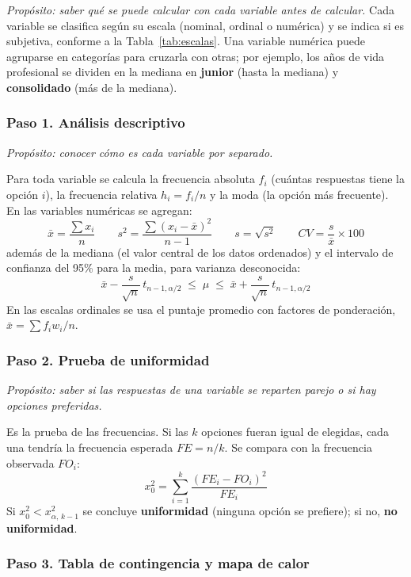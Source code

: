 \documentclass[12pt, a4paper]{article}
\begin{document}
\textit{Propósito: saber qué se puede calcular con cada variable antes
de calcular.} Cada variable se clasifica según su escala (nominal,
ordinal o numérica) y se indica si es subjetiva, conforme a la
Tabla~\ref{tab:escalas}. Una variable numérica puede agruparse en
categorías para cruzarla con otras; por ejemplo, los años de vida
profesional se dividen en la mediana en \textbf{junior} (hasta la
mediana) y \textbf{consolidado} (más de la mediana).

\subsubsection{Paso 1. Análisis descriptivo}

\textit{Propósito: conocer cómo es cada variable por separado.}

Para toda variable se calcula la frecuencia absoluta $f_i$ (cuántas
respuestas tiene la opción $i$), la frecuencia relativa $h_i = f_i/n$ y la
moda (la opción más frecuente). En las variables numéricas se agregan:
\[
\bar{x} = \frac{\sum x_i}{n} \qquad
s^2 = \frac{\sum (x_i - \bar{x})^2}{n-1} \qquad
s = \sqrt{s^2} \qquad
CV = \frac{s}{\bar{x}} \times 100
\]
además de la mediana (el valor central de los datos ordenados) y el
intervalo de confianza del 95\% para la media, para varianza desconocida:
\[
\bar{x} - \frac{s}{\sqrt{n}}\,t_{n-1,\alpha/2} \;\le\; \mu \;\le\; \bar{x} + \frac{s}{\sqrt{n}}\,t_{n-1,\alpha/2}
\]
En las escalas ordinales se usa el puntaje promedio con factores de
ponderación, $\bar{x} = \sum f_i w_i / n$.

\subsubsection{Paso 2. Prueba de uniformidad}

\textit{Propósito: saber si las respuestas de una variable se reparten
parejo o si hay opciones preferidas.}

Es la prueba de las frecuencias. Si las $k$ opciones fueran igual de
elegidas, cada una tendría la frecuencia esperada $FE = n/k$. Se compara
con la frecuencia observada $FO_i$:
\[
x_0^2 = \sum_{i=1}^{k} \frac{(FE_i - FO_i)^2}{FE_i}
\]
Si $x_0^2 < x^2_{\alpha,\,k-1}$ se concluye \textbf{uniformidad} (ninguna
opción se prefiere); si no, \textbf{no uniformidad}.

\subsubsection{Paso 3. Tabla de contingencia y mapa de calor}
\end{document}
